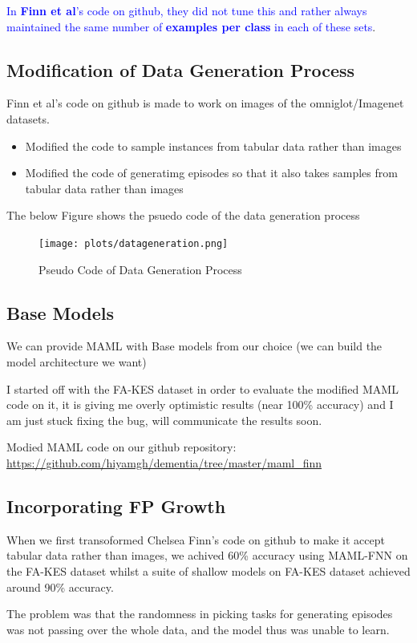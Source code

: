 \documentclass{article}
\begin{document}
\textcolor{blue}{In \textbf{Finn et al}'s code on github, they did not tune this and rather always maintained the same number of \textbf{examples per class} in each of these sets}.

\subsection{Modification of Data Generation Process}
Finn et al's code on github is made to work on images of the omniglot/Imagenet datasets.
\begin{itemize}
    \item Modified the code to sample instances from tabular data rather than images
    \item Modified the code of generatimg episodes so that it also takes samples from tabular data rather than images
\end{itemize}

The below Figure shows the psuedo code of the data generation process
\begin{figure}[H]
    \texttt{[image: plots/datageneration.png]}
    \caption{Pseudo Code of Data Generation Process}
    \label{fig:my_label}
\end{figure}

\subsection*{Base Models}
We can provide MAML with Base models from our choice (we can build the model architecture we want)

\noindent I started off with the FA-KES dataset in order to evaluate the modified MAML code on it, it is giving me overly optimistic results (near 100\% accuracy) and I am just stuck fixing the bug, will communicate the results soon.

Modied MAML code on our github repository: \url{https://github.com/hiyamgh/dementia/tree/master/maml_finn}

\subsection{Incorporating FP Growth}
When we first transoformed Chelsea Finn's code on github to make it accept tabular data rather than images, we achived 60\% accuracy using MAML-FNN on the FA-KES dataset whilst a suite of shallow models on FA-KES dataset achieved around 90\% accuracy. 

\noindent The problem was that the randomness in picking tasks for generating episodes was not passing over the whole data, and the model thus was unable to learn.
\end{document}
